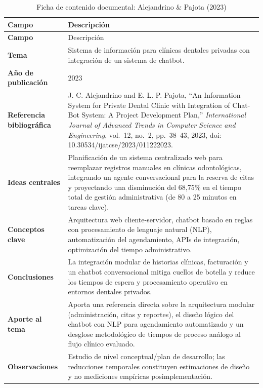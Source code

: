 \begin{longtable}{|>{\bfseries}p{4cm}|p{\dimexpr\linewidth-4cm-4\tabcolsep-4\arrayrulewidth\relax}|}
\caption{Ficha de contenido documental: Alejandrino \& Pajota (2023)}
\label{tab:ficha_alejandrino_2023} \\
\hline
Campo & Descripción \\ \hline
\endfirsthead
\hline
Campo & Descripción \\ \hline
\endhead
\hline
\endfoot
Tema & Sistema de información para clínicas dentales privadas con integración de un sistema de chatbot. \\ \hline
Año de publicación & 2023 \\ \hline
Referencia bibliográfica & J. C. Alejandrino and E. L. P. Pajota, ``An Information System for Private Dental Clinic with Integration of Chat-Bot System: A Project Development Plan,'' \textit{International Journal of Advanced Trends in Computer Science and Engineering}, vol.~12, no.~2, pp.~38--43, 2023, doi: 10.30534/ijatcse/2023/011222023. \\ \hline
Ideas centrales & Planificación de un sistema centralizado web para reemplazar registros manuales en clínicas odontológicas, integrando un agente conversacional para la reserva de citas y proyectando una disminución del 68{,}75\% en el tiempo total de gestión administrativa (de 80 a 25 minutos en tareas clave). \\ \hline
Conceptos clave & Arquitectura web cliente-servidor, chatbot basado en reglas con procesamiento de lenguaje natural (NLP), automatización del agendamiento, APIs de integración, optimización del tiempo administrativo. \\ \hline
Conclusiones & La integración modular de historias clínicas, facturación y un chatbot conversacional mitiga cuellos de botella y reduce los tiempos de espera y procesamiento operativo en entornos dentales privados. \\ \hline
Aporte al tema & Aporta una referencia directa sobre la arquitectura modular (administración, citas y reportes), el diseño lógico del chatbot con NLP para agendamiento automatizado y un desglose metodológico de tiempos de proceso análogo al flujo clínico evaluado. \\ \hline
Observaciones & Estudio de nivel conceptual/plan de desarrollo; las reducciones temporales constituyen estimaciones de diseño y no mediciones empíricas posimplementación. \\ \hline
\end{longtable}


